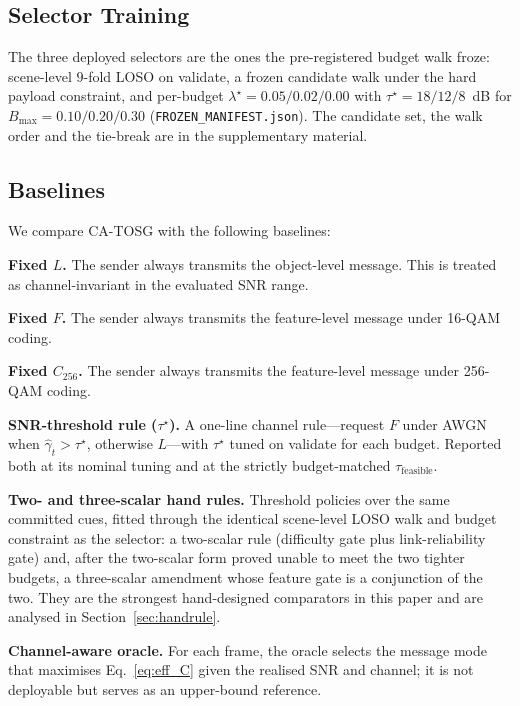 \documentclass[journal]{IEEEtran}
\newcommand{\method}{CA-TOSG}
\begin{document}
\subsection{Selector Training}\label{sec:training}

The three deployed selectors are the ones the pre-registered budget walk froze: scene-level $9$-fold
LOSO on validate, a frozen candidate walk under the hard payload constraint, and per-budget
$\lambda^\star = 0.05/0.02/0.00$ with $\tau^\star = 18/12/8$~dB for
$B_{\max}=0.10/0.20/0.30$ (\texttt{FROZEN\_MANIFEST.json}). The candidate set, the walk order and the
tie-break are in the supplementary material.

\subsection{Baselines}

We compare \method{} with the following baselines:

\textbf{Fixed $L$.} The sender always transmits the object-level message. This is treated as channel-invariant in the evaluated SNR range.

\textbf{Fixed $F$.} The sender always transmits the feature-level message under 16-QAM coding.

\textbf{Fixed $C_{256}$.} The sender always transmits the feature-level message under 256-QAM coding.

\textbf{SNR-threshold rule ($\tau^\star$).} A one-line channel rule---request $F$ under AWGN when $\hat\gamma_t>\tau^\star$, otherwise $L$---with $\tau^\star$ tuned on validate for each budget. Reported both at its nominal tuning and at the strictly budget-matched $\tau_{\mathrm{feasible}}$.

\textbf{Two- and three-scalar hand rules.} Threshold policies over the same committed cues, fitted through the identical scene-level LOSO walk and budget constraint as the selector: a two-scalar rule (difficulty gate plus link-reliability gate) and, after the two-scalar form proved unable to meet the two tighter budgets, a three-scalar amendment whose feature gate is a conjunction of the two. They are the strongest hand-designed comparators in this paper and are analysed in Section~\ref{sec:handrule}.

\textbf{Channel-aware oracle.} For each frame, the oracle selects the message mode that maximises Eq.~\eqref{eq:eff_C} given the realised SNR and channel; it is not deployable but serves as an upper-bound reference.
\end{document}
